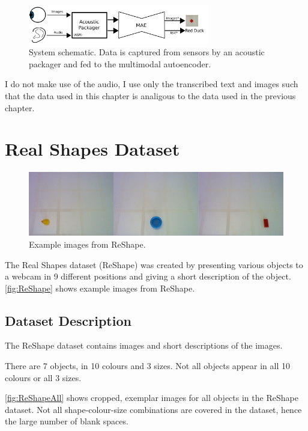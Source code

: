 \begin{figure}[h]
    \centering
    \includegraphics[width=0.7\textwidth]{Figs/chapter6/bimodal_system_schematic.png}
    \caption{System schematic. Data is captured from sensors by an acoustic packager and fed to the multimodal autoencoder.}
    \label{fig:schematic}
\end{figure}

I do not make use of the audio, I use only the transcribed text and images such that the data used in this chapter is analigous to the data used in the previous chapter.

\section{Real Shapes Dataset}

\begin{figure}[h]
    \centering
    \includegraphics[width=\textwidth]{Figs/chapter6/ReShapeExs.png}
    \caption{Example images from ReShape.}
    \label{fig:ReShape}
\end{figure}

The Real Shapes dataset (ReShape) was created by presenting various objects to a webcam in 9 different positions and giving a short description of the object. \autoref{fig:ReShape} shows example images from ReShape.

\subsection{Dataset Description}
The ReShape dataset contains images and short descriptions of the images.

There are 7 objects, in 10 colours and 3 sizes. Not all objects appear in all 10 colours or all 3 sizes.

\autoref{fig:ReShapeAll} shows cropped, exemplar images for all objects in the ReShape dataset. Not all shape-colour-size combinations are covered in the dataset, hence the large number of blank spaces.


